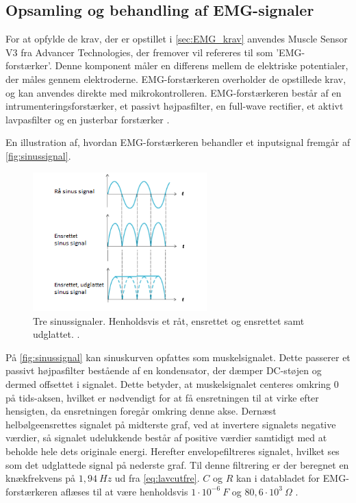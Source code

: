 \subsection{Opsamling og behandling af EMG-signaler} \label{sec:EMG_imp}
For at opfylde de krav, der er opstillet i \autoref{sec:EMG_krav} anvendes Muscle Sensor V3 fra Advancer Technologies, der fremover vil refereres til som 'EMG-forstærker'. Denne komponent måler en differens mellem de elektriske potentialer, der måles gennem elektroderne. EMG-forstærkeren overholder de opstillede krav, og kan anvendes direkte med mikrokontrolleren. EMG-forstærkeren består af en intrumenteringsforstærker, et passivt højpasfilter, en full-wave rectifier, et aktivt lavpasfilter og en justerbar forstærker \citep{advancertech2013}. 

En illustration af, hvordan EMG-forstærkeren behandler et inputsignal fremgår af \autoref{fig:sinussignal}.
\begin{figure}[H]
\centering
\includegraphics[width=0.6\textwidth]{figures/sinussignal.png}
\caption{Tre sinussignaler. Henholdsvis et råt, ensrettet og ensrettet samt udglattet. \citep{advancertech2013}.}
\label{fig:sinussignal}
\end{figure}

\noindent
På \autoref{fig:sinussignal} kan sinuskurven opfattes som muskelsignalet. Dette passerer et passivt højpasfilter bestående af en kondensator, der dæmper DC-støjen og dermed offsettet i signalet. Dette betyder, at muskelsignalet centeres omkring 0 på tids-aksen, hvilket er nødvendigt for at få ensretningen til at virke efter hensigten, da ensretningen foregår omkring denne akse. Dernæst helbølgeensrettes signalet på midterste graf, ved at invertere signalets negative værdier, så signalet udelukkende består af positive værdier samtidigt med at beholde hele dets originale energi. Herefter envelopefiltreres signalet, hvilket ses som det udglattede signal på nederste graf. Til denne filtrering er der beregnet en knækfrekvens på $1,94~Hz$ ud fra \autoref{eq:lavcutfre}. $C$ og $R$ kan i databladet for EMG-forstærkeren aflæses til at være henholdsvis $1 \cdot 10^{-6}~F$ og $80,6 \cdot 10^3~\Omega$ \citep{advancertech2013}. 

